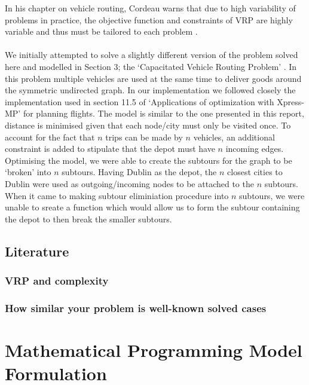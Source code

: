 \documentclass[a4paper,11pt]{article}
\begin{document}
In his chapter on vehicle routing, Cordeau warns that due to high variability of problems in practice, the objective function and constraints of VRP are highly variable and thus must be tailored to each problem \cite{cordeau2007vehicle}.
\\\\
We initially attempted to solve a slightly different version of the problem solved here and modelled in Section 3; the `Capacitated Vehicle Routing Problem' \cite{toth2002models}. In this problem multiple vehicles are used at the same time to deliver goods around the symmetric undirected graph. In our implementation we followed closely the implementation used in section 11.5 of  `Applications of optimization with Xpress-MP'  \cite{gueret1999applications} for planning flights. The model is similar to the one presented in this report, distance is minimised given that each node/city must only be visited once. To account for the fact that $n$ trips can be made by $n$ vehicles, an additional constraint is added to stipulate that the depot must have $n$ incoming edges. Optimising the model, we were able to create the subtours for the graph to be `broken' into $n$ subtours. Having Dublin as the depot, the $n$ closest cities to Dublin were used as outgoing/incoming nodes to be attached to the $n$ subtours. When it came to making subtour eliminiation procedure into $n$ subtours, we were unable to sreate a function which would allow us to form the subtour containing the depot to then break the smaller subtours.



\subsection{Literature}



\subsubsection{VRP and complexity}



\subsubsection{How similar your problem is well-known solved cases}

\section{Mathematical Programming Model Formulation}
\end{document}
